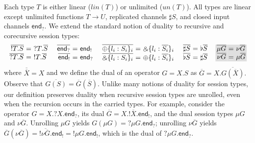 \documentclass[orivec,envcountsame]{llncs}
\makeatletter
\newcommand{\with}{\mathbin\binampersand}
\newcommand{\gvdual}[1]{\overline{#1}}
\newcommand{\gvout}[2]{{!#1.#2}}
\newcommand{\gvin}[2]{{?#1.#2}}
\newcommand{\uto}{\ensuremath{\rightarrow}}
\newcommand{\outterm}{\mkwd{end}_!}
\newcommand{\interm}{\mkwd{end}_?}
\newcommand{\gvserver}[1]{\flat #1}
\newcommand{\gvservice}[1]{\sharp #1}
\newcommand{\mkwd}[1]{\mathsf{#1}}
\newcommand{\un}{un}
\newcommand{\lin}{lin}
\newcommand{\ba}{\begin{array}}
\newcommand{\ea}{\end{array}}
\newenvironment{eqs}{\ba{@{}r@{~}c@{~}l@{}}}{\ea}
\newcommand\shaderow{\noalign{\vskip-0.4pt}\rowcolor{shade}[0.6mm]}
\makeatother
\begin{document}
Each type $T$ is either linear ($\lin(T)$) or unlimited ($\un(T)$).
All types are linear except unlimited functions $T \uto U$, replicated channels $\gvservice{S}$, and
closed input channels $\interm$.
%
We extend the standard notion of duality to recursive and corecursive session types:
%
\small\[
\ba{@{}c@{\quad~}c@{\quad~}c@{\quad~}c@{\quad~}c@{}}
\begin{eqs}
\gvdual{\gvout{T}{S}} &=& \gvin{T}{\gvdual{S}} \\
\gvdual{\gvin{T}{S}} &=& \gvout{T}{\gvdual{S}} \\
\end{eqs}
&
\begin{eqs}
  \gvdual{\interm} &=& \outterm \\
  \gvdual{\outterm} &=& \interm \\
\end{eqs}
&
\begin{eqs}
  \gvdual{\oplus \{ l_i: S_i \}_i} &=& \with \{ l_i : \gvdual{S_i} \}_i \\
  \gvdual{\with \{ l_i: S_i \}_i} &=& \oplus \{ l_i : \gvdual{S_i} \}_i \\
\end{eqs}
&
\begin{eqs}
  \gvdual{\gvservice{S}} &=& \gvserver{\gvdual{S}} \\
  \gvdual{\gvserver{S}} &=& \gvservice{\gvdual{S}} \\
\end{eqs}
&
\begin{eqs}
  \shaderow \gvdual{\mu G} &=& \nu \gvdual{G} \\
  \shaderow \gvdual{\nu G} &=& \mu \gvdual{G}
\end{eqs}
\ea
\]\normalsize
where $\gvdual{\gvdual{X}} = X$ and we define the dual of an operator $G = X.S$ as $\gvdual{G} =
X.\gvdual{G(\gvdual{X})}.$ Observe that $\gvdual{G(S)} = \gvdual{G}(\gvdual{S})$.  Unlike many
notions of duality for session types, our definition preserves duality when recursive session types
are unrolled, even when the recursion occurs in the carried types. For example, consider the
operator $G = X.\gvin{X}{\interm}$, its dual $\gvdual{G} = X.\gvout{\gvdual{X}}{\outterm}$, and the
dual session types $\mu G$ and $\nu \gvdual{G}$. Unrolling $\mu G$ yields $G(\mu G) = \gvin{\mu
  G}{\interm}$; unrolling $\nu \gvdual{G}$ yields
  $\gvdual{G}(\nu \gvdual{G}) = \gvout{\gvdual{\nu \gvdual{G}}}{\outterm} = \gvout{\mu G}{\outterm}$,
which is the dual of $\gvin{\mu G}{\interm}$.
\end{document}
